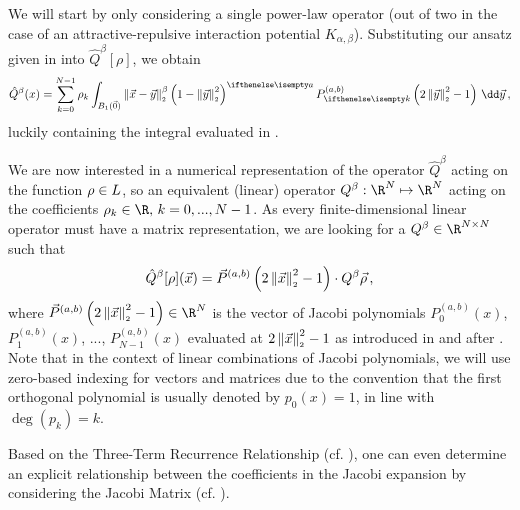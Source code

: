 We will start by only considering a single power-law operator (out of two in the case of an attractive-repulsive interaction potential $K_{\alpha, \beta}$).
Substituting our ansatz given in  into $\hat{Q}^\beta[\rho]$, we obtain
\begin{equation}
  \hat{Q}^{\beta}(x) = \sum_{k=0}^{N-1} \rho_{k} \int_{B_1(\vec{0})} \norm{\vec{x}-\vec{y}}^{\beta} \weight{y}\jacobi{y} \,\dd\vec{y}\,,
  \label{eq:theorem216-in-derivation}
\end{equation}
luckily containing the integral evaluated in .

We are now interested in a numerical representation of the operator $\hat{Q}^\beta$ acting on the function $\rho \in L$, so an equivalent (linear) operator $Q^\beta: \R^N \mapsto \R^N$ acting on the coefficients $\rho_k \in \R,\, k = 0, ..., N-1$.
As every finite-dimensional linear operator must have a matrix representation, we are looking for a $Q^\beta \in \R^{N \times N}$ such that
$$\hat{Q}^\beta[\rho](\vec{x}) = \vec{P}^{(a, b)}\left(2 \left\lVert\vec{x}\right\rVert_{\scriptscriptstyle 2}^2 - 1\right) \cdot Q^\beta \vec{\rho}\,,$$
where $\jacobivec{x} \in \R^N$ is the vector of Jacobi polynomials $P^{(a, b)}_0(x)$, $P^{(a, b)}_1(x)$, ..., $P^{(a, b)}_{N-1}(x)$ evaluated at $2\left\lVert\vec{x}\right\rVert_{\scriptscriptstyle 2}^2 - 1$ as introduced in and after .
Note that in the context of linear combinations of Jacobi polynomials, we will use zero-based indexing for vectors and matrices due to the convention that the first orthogonal polynomial is usually denoted by $p_0(x) = 1$, in line with $\deg(p_k) = k$.

Based on the Three-Term Recurrence Relationship (cf. ), one can even determine an explicit relationship between the coefficients in the Jacobi expansion by considering the Jacobi Matrix (cf. ).

